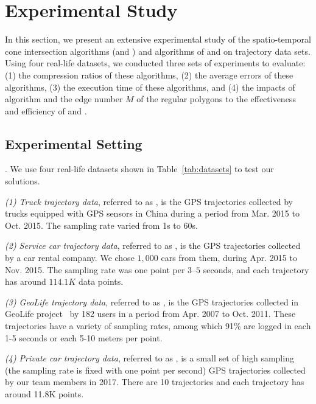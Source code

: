 \section{Experimental Study} %
\label{sec-exp}
In this section, we present an extensive experimental study of the spatio-temporal cone intersection algorithms (\cist and \cista) and algorithms of \dps and \squishe on trajectory data sets.
Using four real-life datasets, we conducted three sets of experiments to evaluate:
(1) the compression ratios of these algorithms,
(2) the average errors of these algorithms,
(3) the execution time of these algorithms, and
(4) the impacts of algorithm \rpia and the edge number $M$ of the regular polygons to the effectiveness and efficiency of \cist and \cista.


\subsection{Experimental Setting}

.
We use four real-life datasets shown in Table~\ref{tab:datasets} to test our solutions.

\ni \emph{(1) Truck trajectory data}, referred to as \truck, is the GPS trajectories collected by  trucks equipped with GPS sensors in China
during a period from Mar. 2015 to Oct. 2015. The sampling rate varied from 1s to 60s.

\ni \emph{(2) Service car trajectory data}, referred to as \sercar,  is the GPS trajectories collected by a car rental company.
We chose $1,000$ cars from them, during Apr. 2015 to Nov. 2015. The sampling rate was one point per $3$--$5$ seconds, and
each trajectory has around $114.1K$ data points.

\ni \emph{(3) GeoLife trajectory data}, referred to as \geolife, is the GPS trajectories collected in GeoLife project~\cite{Zheng:GeoLife} by 182 users in a period from Apr. 2007 to Oct. 2011. These trajectories have a variety of sampling rates, among which 91\% are logged in each 1-5 seconds or each 5-10 meters per point.

\ni \emph{(4) Private car trajectory data}, referred to as \pricar, is a small set of high sampling (the sampling rate is fixed with one point per second) GPS trajectories collected by our team members in 2017. There are 10 trajectories and each trajectory has around 11.8K points.

